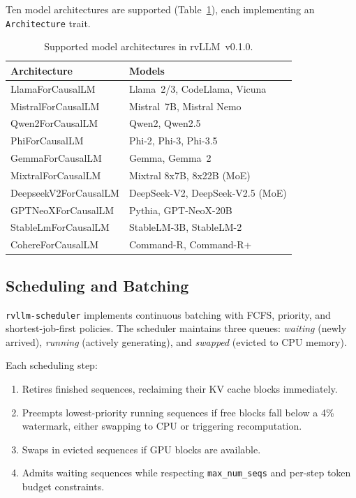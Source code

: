 \documentclass[11pt,a4paper]{article}
\newcommand{\thead}[1]{\textbf{\color{white}#1}}
\begin{document}
Ten model architectures are supported (Table~\ref{tab:architectures}), each
implementing an \texttt{Architecture} trait.

\begin{table}[t]
  \centering
  \caption{Supported model architectures in rvLLM~v0.1.0.}
  \label{tab:architectures}
  \small
  \begin{tabular}{@{}ll@{}}
    \toprule
    \rowcolor{HeaderBlue} \thead{Architecture} & \thead{Models} \\
    \midrule
    LlamaForCausalLM      & Llama~2/3, CodeLlama, Vicuna \\
    \rowcolor{gray!8}
    MistralForCausalLM     & Mistral~7B, Mistral Nemo \\
    Qwen2ForCausalLM       & Qwen2, Qwen2.5 \\
    \rowcolor{gray!8}
    PhiForCausalLM         & Phi-2, Phi-3, Phi-3.5 \\
    GemmaForCausalLM       & Gemma, Gemma~2 \\
    \rowcolor{gray!8}
    MixtralForCausalLM     & Mixtral 8x7B, 8x22B (MoE) \\
    DeepseekV2ForCausalLM  & DeepSeek-V2, DeepSeek-V2.5 (MoE) \\
    \rowcolor{gray!8}
    GPTNeoXForCausalLM     & Pythia, GPT-NeoX-20B \\
    StableLmForCausalLM    & StableLM-3B, StableLM-2 \\
    \rowcolor{gray!8}
    CohereForCausalLM      & Command-R, Command-R+ \\
    \bottomrule
  \end{tabular}
\end{table}

\subsection{Scheduling and Batching}

\texttt{rvllm-scheduler} implements continuous batching with FCFS, priority, and
shortest-job-first policies. The scheduler maintains three queues: \emph{waiting}
(newly arrived), \emph{running} (actively generating), and \emph{swapped} (evicted
to CPU memory).

Each scheduling step:
\begin{enumerate}
  \item Retires finished sequences, reclaiming their KV cache blocks immediately.
  \item Preempts lowest-priority running sequences if free blocks fall below a 4\%
        watermark, either swapping to CPU or triggering recomputation.
  \item Swaps in evicted sequences if GPU blocks are available.
  \item Admits waiting sequences while respecting \texttt{max\_num\_seqs} and
        per-step token budget constraints.
\end{enumerate}
\end{document}
